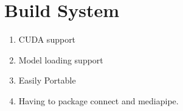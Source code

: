 \section{Build System}
\begin{enumerate}
	\item CUDA support
	\item Model loading support
	\item Easily Portable
	\item Having to package connect and mediapipe.
\end{enumerate}